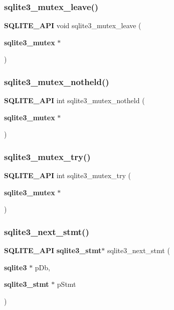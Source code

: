 \mbox{\label{sqlite3_8h_a5838d235601dbd3c1fa993555c6bcc93}} 
\subsubsection{sqlite3\_mutex\_leave()}
{\footnotesize\ttfamily \textbf{ S\+Q\+L\+I\+T\+E\+\_\+\+A\+PI} void sqlite3\+\_\+mutex\+\_\+leave (\begin{DoxyParamCaption}\item[{\textbf{ sqlite3\+\_\+mutex} $\ast$}]{ }\end{DoxyParamCaption})}

\mbox{\label{sqlite3_8h_a83967c837c1c000d3b5adcfaa688f5dc}} 
\subsubsection{sqlite3\_mutex\_notheld()}
{\footnotesize\ttfamily \textbf{ S\+Q\+L\+I\+T\+E\+\_\+\+A\+PI} int sqlite3\+\_\+mutex\+\_\+notheld (\begin{DoxyParamCaption}\item[{\textbf{ sqlite3\+\_\+mutex} $\ast$}]{ }\end{DoxyParamCaption})}

\mbox{\label{sqlite3_8h_a196f84b09bdfda96ae5ae23189be1ec8}} 
\subsubsection{sqlite3\_mutex\_try()}
{\footnotesize\ttfamily \textbf{ S\+Q\+L\+I\+T\+E\+\_\+\+A\+PI} int sqlite3\+\_\+mutex\+\_\+try (\begin{DoxyParamCaption}\item[{\textbf{ sqlite3\+\_\+mutex} $\ast$}]{ }\end{DoxyParamCaption})}

\mbox{\label{sqlite3_8h_ab2db7c6250bae4bb044194ceca1d50ba}} 
\subsubsection{sqlite3\_next\_stmt()}
{\footnotesize\ttfamily \textbf{ S\+Q\+L\+I\+T\+E\+\_\+\+A\+PI} \textbf{ sqlite3\+\_\+stmt}$\ast$ sqlite3\+\_\+next\+\_\+stmt (\begin{DoxyParamCaption}\item[{\textbf{ sqlite3} $\ast$}]{p\+Db,  }\item[{\textbf{ sqlite3\+\_\+stmt} $\ast$}]{p\+Stmt }\end{DoxyParamCaption})}

